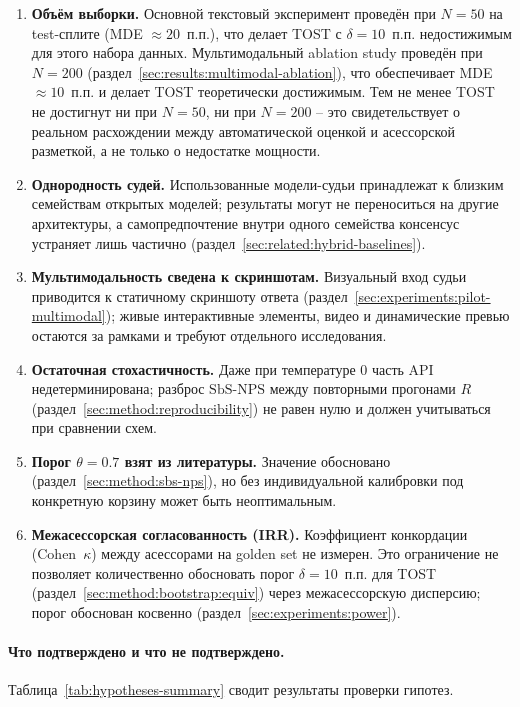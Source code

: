 \begin{enumerate}
    \item \textbf{Объём выборки.} Основной текстовый эксперимент проведён
        при $N = 50$ на test-сплите (MDE $\approx 20$~п.п.), что делает
        TOST с $\delta = 10$~п.п. недостижимым для этого набора данных.
        Мультимодальный ablation study проведён при $N = 200$
        (раздел~\ref{sec:results:multimodal-ablation}), что обеспечивает
        MDE $\approx 10$~п.п. и делает TOST теоретически достижимым.
        Тем не менее TOST не достигнут ни при $N = 50$, ни при $N = 200$ --
        это свидетельствует о реальном расхождении между автоматической
        оценкой и асессорской разметкой, а не только о недостатке мощности.
    \item \textbf{Однородность судей.} Использованные модели-судьи
        принадлежат к близким семействам открытых моделей; результаты
        могут не переноситься на другие архитектуры, а самопредпочтение
        внутри одного семейства консенсус устраняет лишь частично
        (раздел~\ref{sec:related:hybrid-baselines}).
    \item \textbf{Мультимодальность сведена к скриншотам.} Визуальный
        вход судьи приводится к статичному скриншоту ответа
        (раздел~\ref{sec:experiments:pilot-multimodal}); живые
        интерактивные элементы, видео и динамические превью остаются за
        рамками и требуют отдельного исследования.
    \item \textbf{Остаточная стохастичность.} Даже при температуре $0$
        часть API недетерминирована; разброс
        $\mathrm{SbS\text{-}NPS}$ между повторными прогонами $R$
        (раздел~\ref{sec:method:reproducibility}) не равен нулю и должен
        учитываться при сравнении схем.
    \item \textbf{Порог $\theta = 0.7$ взят из литературы.} Значение
        обосновано (раздел~\ref{sec:method:sbs-nps}), но без
        индивидуальной калибровки под конкретную корзину может быть
        неоптимальным.
    \item \textbf{Межасессорская согласованность (IRR).} Коэффициент конкордации (Cohen~$\kappa$) между асессорами на golden set не измерен. Это ограничение не позволяет количественно обосновать порог $\delta = 10$~п.п. для TOST (раздел~\ref{sec:method:bootstrap:equiv}) через межасессорскую дисперсию; порог обоснован косвенно (раздел~\ref{sec:experiments:power}).
\end{enumerate}

\paragraph{Что подтверждено и что не подтверждено.}
Таблица~\ref{tab:hypotheses-summary} сводит результаты проверки гипотез.

